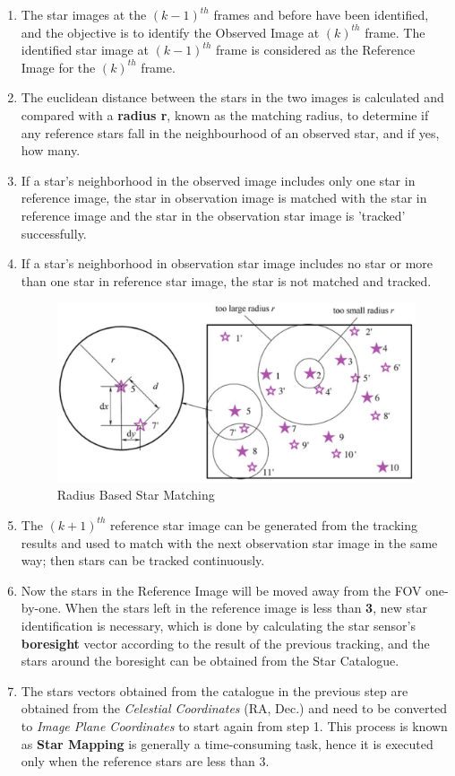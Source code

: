 \documentclass[../../main.tex]{subfiles}
\begin{document}
\begin{enumerate} \label{rapid_explain}
    \item The star images at the $(k-1)^{th}$ frames and before have been identified, and the objective is to identify the Observed Image at $(k)^{th}$ frame. The identified star image at $(k-1)^{th}$ frame is considered as the Reference Image for the $(k)^{th}$ frame. 
    \item The euclidean distance between the stars in the two images is calculated and compared with a \textbf{radius r}, known as the matching radius, to determine if any reference stars fall in the neighbourhood of an observed star, and if yes, how many. 
    \item If a star's neighborhood in the observed image includes only one star in reference image, the star in observation image is matched with the star in reference image and the star in the observation star image is 'tracked' successfully.
    \item If a star's neighborhood in observation star image includes no
    star or more than one star in reference star image, the star is not matched and tracked. 
    \begin{figure}[!h]
        \centering
        \includegraphics[scale=0.3]{Figures/GNC/radius_based_zhang.png}
        \caption{Radius Based Star Matching}
        \label{fig:radius_zhang}
    \end{figure}
    \item The $(k+1)^{th}$ reference star image can be generated from the tracking results and used to match with the next observation star image in the same way; then stars can be tracked continuously.
    \item Now the stars in the Reference Image will be moved away from the FOV one-by-one. When the stars left in the reference image is less than \textbf{3}, new star identification is necessary, which is done by calculating the star sensor's \textbf{boresight} vector according to the result of the previous tracking, and the stars around the boresight can be obtained from the Star Catalogue.  
    \item The stars vectors obtained from the catalogue in the previous step are obtained from the \textit{Celestial Coordinates} (RA, Dec.) and need to be converted to \textit{Image Plane Coordinates} to start again from step 1. This process is known as \textbf{Star Mapping} is generally a time-consuming task, hence it is executed only when the reference stars are less than 3. 
\end{enumerate}
\end{document}
